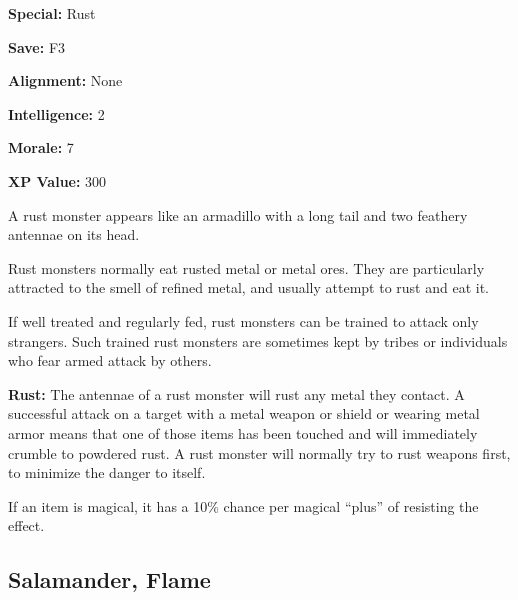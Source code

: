 \begin{multicols*}{2}
{\textbf{Special:} Rust

\textbf{Save:} F3

\textbf{Alignment:} None

\textbf{Intelligence:} 2

\textbf{Morale:} 7

\textbf{XP Value:} 300}

A rust monster appears like an armadillo with a long tail and two feathery antennae on its head.

Rust monsters normally eat rusted metal or metal ores. They are particularly attracted to the smell of refined metal, and usually attempt to rust and eat it.

If well treated and regularly fed, rust monsters can be trained to attack only strangers. Such trained rust monsters are sometimes kept by tribes or individuals who fear armed attack by others.

\textbf{Rust:} The antennae of a rust monster will rust any metal they contact. A successful attack on a target with a metal weapon or shield or wearing metal armor means that one of those items has been touched and will immediately crumble to powdered rust. A rust monster will normally try to rust weapons first, to minimize the danger to itself.

If an item is magical, it has a 10\% chance per magical “plus” of resisting the effect.

\subsection{Salamander, Flame}
\end{multicols*}
